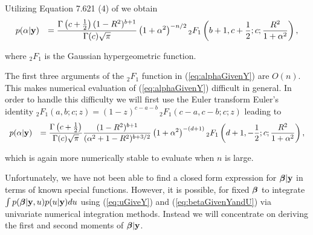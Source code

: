 \documentclass{article}[12pt]
\begin{document}
\noindent 
Utilizing  Equation 7.621 (4) of \cite{Gradshteyn2007} we obtain
\begin{equation}\label{eq:alphaGivenY}
\begin{array}{rl}
\displaystyle p(\alpha|{\bf y}) 
& \displaystyle = \frac{ \Gamma\left( c + \tfrac{1}{2} \right) (1 -  R^2)^{b+1}  }{ \Gamma(c)\sqrt{\pi}} 
\left( 1+\alpha^2 \right)^{-n/2} {}_2F_1\left( b+1, c + \frac{1}{2}; c; \frac{R^2}{1+\alpha^2}  \right),
\end{array}
\end{equation}

\noindent where ${}_2F_1$ is the Gaussian hypergeometric function.

The first three arguments of the ${}_2F_1$ function in (\ref{eq:alphaGivenY}) are $O(n)$. This makes 
numerical evaluation of (\ref{eq:alphaGivenY}) difficult in general. In order to handle this difficulty
we will first use the Euler transform
Euler's identity 
${}_{2}F_{1}(a,b;c;z)=(1-z)^{c-a-b}\,{}_{2}F_{1}(c-a,c-b;c;z)$ leading to
\begin{equation}\label{eq:alphaGivenY_2}
	\begin{array}{rl}
		\displaystyle p(\alpha|{\bf y}) 
		& \displaystyle = \frac{ \Gamma\left( c + \tfrac{1}{2} \right)   }{ \Gamma(c)\sqrt{\pi}} 
		\frac{(1 -  R^2)^{b+1}}{(  \alpha^2 + 1 - R^2 )^{b+3/2}}
		\left( 1+\alpha^2 \right)^{ - (d+1) }   
		
		 {}_2F_1\left( d + 1,  - \frac{1}{2}; c; \frac{R^2}{1+\alpha^2}  \right),
	\end{array}
\end{equation}

\noindent which is again more numerically stable to evaluate
when $n$ is large.
 
Unfortunately, we have not been able to find a closed form expression
for ${\boldsymbol \beta}|{\bf y}$ in terms of known special functions. However,
it is possible, for fixed ${\boldsymbol \beta}$ to integrate $\int p({\boldsymbol \beta}|{\bf y},u)p(u|{\bf y})du$
using  (\ref{eq:uGiveY})  and (\ref{eq:betaGivenYandU})
via univariate numerical integration methods.
Instead we will concentrate on deriving the first and second moments of ${\boldsymbol \beta}|{\bf y}$.
\end{document}
